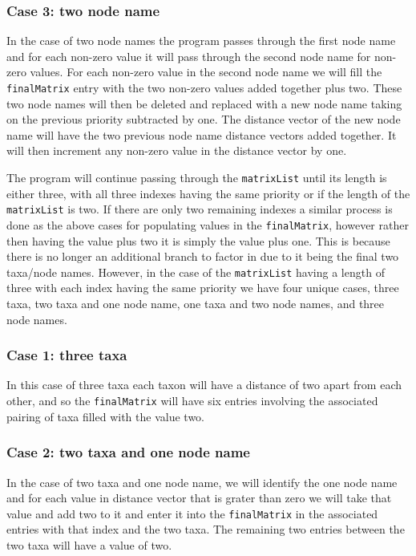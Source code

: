 \documentclass{article}
\begin{document}
\subsubsection{Case 3: two node name}
In the case of two node names the program passes through the first node name and for each non-zero value it will pass through the second node name for non-zero values. For each non-zero value in the second node name we will fill the {\tt finalMatrix} entry with the two non-zero values added together plus two. These two node names will then be deleted and replaced with a new node name taking on the previous priority subtracted by one. The distance vector of the new node name will have the two previous node name distance vectors added together. It will then increment any non-zero value in the distance vector by one. 

\bigskip


The program will continue passing through the {\tt matrixList} until its length is either three, with all three indexes having the same priority or if the length of the {\tt matrixList} is two. If there are only two remaining indexes a similar process is done as the above cases for populating values in the {\tt finalMatrix}, however rather then having the value plus two it is simply the value plus one. This is because there is no longer an additional branch to factor in due to it being the final two taxa/node names. 
However, in the case of the {\tt matrixList} having a length of three with each index having the same priority we have four unique cases, three taxa, two taxa and one node name, one taxa and two node names, and three node names. 

\subsubsection{Case 1: three taxa}

In this case of three taxa each taxon will have a distance of two apart from each other, and so the {\tt finalMatrix} will have six entries involving the associated pairing of taxa filled with the value two.

\subsubsection{Case 2: two taxa and one node name}

In the case of two taxa and one node name, we will identify the one node name and for each value in distance vector that is grater than zero we will take that value and add two to it and enter it into the {\tt finalMatrix} in the associated entries with that index and the two taxa. The remaining two entries between the two taxa will have a value of two.
\end{document}
